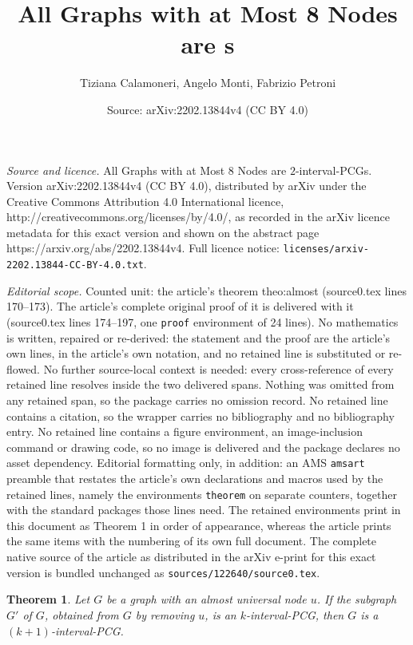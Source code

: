 \documentclass[10pt,a4paper]{amsart}
\title{All Graphs with at Most 8 Nodes are \Int{2}s}
\author{Tiziana Calamoneri, Angelo Monti, Fabrizio Petroni}
\date{Source: arXiv:2202.13844v4 (CC BY 4.0)}
\newtheorem{theorem}{Theorem}
\newcommand{\Int}[1]{$#1$\textnormal{-interval-PCG}}
\begin{document}
\maketitle

\noindent\emph{Source and licence.} All Graphs with at Most 8 Nodes are \Int{2}s. Version arXiv:2202.13844v4 (CC BY 4.0), distributed by arXiv under the Creative Commons Attribution 4.0 International licence, http://creativecommons.org/licenses/by/4.0/, as recorded in the arXiv licence metadata for this exact version and shown on the abstract page https://arxiv.org/abs/2202.13844v4. Full licence notice: \texttt{licenses/arxiv-2202.13844-CC-BY-4.0.txt}.\par\smallskip

\noindent\textit{Editorial scope.} Counted unit: the article's theorem theo:almost (source0.tex lines 170--173). The article's complete original proof of it is delivered with it (source0.tex lines 174--197, one \texttt{proof} environment of 24 lines). No mathematics is written, repaired or re-derived: the statement and the proof are the article's own lines, in the article's own notation, and no retained line is substituted or re-flowed.  No further source-local context is needed: every cross-reference of every retained line resolves inside the two delivered spans.  Nothing was omitted from any retained span, so the package carries no omission record.  No retained line contains a citation, so the wrapper carries no bibliography and no bibliography entry.  No retained line contains a figure environment, an image-inclusion command or drawing code, so no image is delivered and the package declares no asset dependency.  Editorial formatting only, in addition: an AMS \texttt{amsart} preamble that restates the article's own declarations and macros used by the retained lines, namely the environments \texttt{theorem} on separate counters, together with the standard packages those lines need.  The retained environments print in this document as Theorem 1 in order of appearance, whereas the article prints the same items with the numbering of its own full document.  The complete native source of the article as distributed in the arXiv e-print for this exact version is bundled unchanged as \texttt{sources/122640/source0.tex}.
\begin{theorem}
\label{theo:almost}
Let $G$ be a graph with an almost universal node $u$. If the subgraph $G'$ of $G$, obtained from $G$ by removing $u$, is  an \Int{k}, then $G$ is a \Int{(k+1)}.
\end{theorem}
\end{document}
